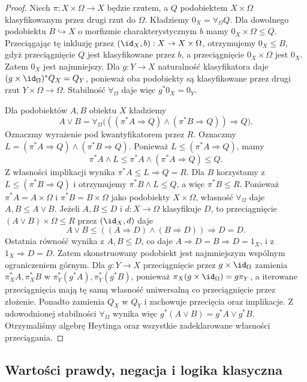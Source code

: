 \begin{proof}
Niech $\pi:X\times\Omega\to X$ będzie rzutem, a $Q$ podobiektem $X\times\Omega$ klasyfikowanym przez drugi rzut do $\Omega$. Kładziemy $0_X=\forall_\Omega Q$. Dla dowolnego podobiektu $B\hookrightarrow X$ o morfizmie charakterystycznym $b$ mamy $0_X\times\Omega\leq Q$. Przeciągając tę inkluzję przez $(\id_X,b):X\to X\times\Omega$, otrzymujemy $0_X\leq B$, gdyż przeciągnięcie $Q$ jest klasyfikowane przez $b$, a przeciągnięcie $0_X\times\Omega$ jest $0_X$. Zatem $0_X$ jest najmniejszy. Dla $g:Y\to X$ naturalność klasyfikatora daje $(g\times\id_\Omega)^*Q_X=Q_Y$, ponieważ oba podobiekty są klasyfikowane przez drugi rzut $Y\times\Omega\to\Omega$. Stabilność $\forall_\Omega$ daje więc $g^*0_X=0_Y$.

Dla podobiektów $A,B$ obiektu $X$ kładziemy
\[
 A\vee B=\forall_\Omega
 \bigl(((\pi^*A\Rightarrow Q)\wedge(\pi^*B\Rightarrow Q))\Rightarrow Q\bigr).
\]
Oznaczmy wyrażenie pod kwantyfikatorem przez $R$. Oznaczmy $L=(\pi^*A\Rightarrow Q)\wedge(\pi^*B\Rightarrow Q)$. Ponieważ $L\leq(\pi^*A\Rightarrow Q)$, mamy
\[
 \pi^*A\wedge L\leq \pi^*A\wedge(\pi^*A\Rightarrow Q)\leq Q.
\]
Z własności implikacji wynika $\pi^*A\leq L\Rightarrow Q=R$. Dla $B$ korzystamy z $L\leq(\pi^*B\Rightarrow Q)$ i otrzymujemy $\pi^*B\wedge L\leq Q$, a więc $\pi^*B\leq R$. Ponieważ $\pi^*A=A\times\Omega$ i $\pi^*B=B\times\Omega$ jako podobiekty $X\times\Omega$, własność $\forall_\Omega$ daje $A,B\leq A\vee B$. Jeżeli $A,B\leq D$ i $d:X\to\Omega$ klasyfikuje $D$, to przeciągnięcie $(A\vee B)\times\Omega\leq R$ przez $(\id_X,d)$ daje
\[
 A\vee B\leq ((A\Rightarrow D)\wedge(B\Rightarrow D))\Rightarrow D=D.
\]
Ostatnia równość wynika z $A,B\leq D$, co daje $A\Rightarrow D=B\Rightarrow D=1_X$, i z $1_X\Rightarrow D=D$. Zatem skonstruowany podobiekt jest najmniejszym wspólnym ograniczeniem górnym. Dla $g:Y\to X$ przeciągnięcie przez $g\times\id_\Omega$ zamienia $\pi_X^*A,\pi_X^*B$ w $\pi_Y^*(g^*A),\pi_Y^*(g^*B)$, ponieważ $\pi_X(g\times\id_\Omega)=g\pi_Y$, a iterowane przeciągnięcia mają tę samą własność uniwersalną co przeciągnięcie przez złożenie. Ponadto zamienia $Q_X$ w $Q_Y$ i zachowuje przecięcia oraz implikacje. Z udowodnionej stabilności $\forall_\Omega$ wynika więc $g^*(A\vee B)=g^*A\vee g^*B$. Otrzymaliśmy algebrę Heytinga oraz wszystkie zadeklarowane własności przeciągania.
\end{proof}

\subsection{Wartości prawdy, negacja i logika klasyczna}

